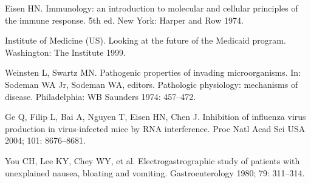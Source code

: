 \documentclass[USenglish,twocolumn]{article}
\begin{document}
\begin{thebibliography}{9}

Eisen HN. Immunology: an introduction to molecular and cellular
principles of the immune response. 5th ed. New York: Harper and
Row 1974.

Institute of Medicine (US). Looking at the future of the Medicaid
program. Washington: The Institute 1999.

Weinsten L, Swartz MN. Pathogenic properties of invading
microorganisms. In: Sodeman WA Jr, Sodeman WA, editors. Pathologic
physiology: mechanisms of disease. Philadelphia: WB Saunders 1974:
457--472.

Ge Q, Filip L, Bai A, Nguyen T, Eisen HN, Chen J. Inhibition
of influenza virus production in virus-infected mice by RNA interference.
Proc Natl Acad Sci USA 2004; 101: 8676--8681.

You CH, Lee KY, Chey WY, et al. Electrogastrographic study
of patients with unexplained nausea, bloating and vomiting. Gastroenterology 1980; 79: 311--314.

\end{thebibliography}
\end{document}
